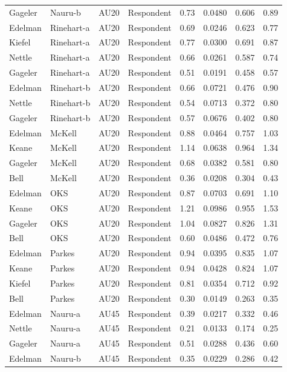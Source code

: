 \documentclass{monashthesis}
\begin{document}
\begin{center}
\begin{longtable}{llllllll}
Gageler & Nauru-b & AU20 & Respondent & 0.73 & 0.0480 & 0.606 & 0.89 \\
Edelman & Rinehart-a & AU20 & Respondent & 0.69 & 0.0246 & 0.623 & 0.77 \\
Kiefel & Rinehart-a & AU20 & Respondent & 0.77 & 0.0300 & 0.691 & 0.87 \\
Nettle & Rinehart-a & AU20 & Respondent & 0.66 & 0.0261 & 0.587 & 0.74 \\
Gageler & Rinehart-a & AU20 & Respondent & 0.51 & 0.0191 & 0.458 & 0.57 \\
Edelman & Rinehart-b & AU20 & Respondent & 0.66 & 0.0721 & 0.476 & 0.90 \\
Nettle & Rinehart-b & AU20 & Respondent & 0.54 & 0.0713 & 0.372 & 0.80 \\
Gageler & Rinehart-b & AU20 & Respondent & 0.57 & 0.0676 & 0.402 & 0.80 \\
Edelman & McKell & AU20 & Respondent & 0.88 & 0.0464 & 0.757 & 1.03 \\
Keane & McKell & AU20 & Respondent & 1.14 & 0.0638 & 0.964 & 1.34 \\
Gageler & McKell & AU20 & Respondent & 0.68 & 0.0382 & 0.581 & 0.80 \\
Bell & McKell & AU20 & Respondent & 0.36 & 0.0208 & 0.304 & 0.43 \\
Edelman & OKS & AU20 & Respondent & 0.87 & 0.0703 & 0.691 & 1.10 \\
Keane & OKS & AU20 & Respondent & 1.21 & 0.0986 & 0.955 & 1.53 \\
Gageler & OKS & AU20 & Respondent & 1.04 & 0.0827 & 0.826 & 1.31 \\
Bell & OKS & AU20 & Respondent & 0.60 & 0.0486 & 0.472 & 0.76 \\
Edelman & Parkes & AU20 & Respondent & 0.94 & 0.0395 & 0.835 & 1.07 \\
Keane & Parkes & AU20 & Respondent & 0.94 & 0.0428 & 0.824 & 1.07 \\
Kiefel & Parkes & AU20 & Respondent & 0.81 & 0.0354 & 0.712 & 0.92 \\
Bell & Parkes & AU20 & Respondent & 0.30 & 0.0149 & 0.263 & 0.35 \\
Edelman & Nauru-a & AU45 & Respondent & 0.39 & 0.0217 & 0.332 & 0.46 \\
Nettle & Nauru-a & AU45 & Respondent & 0.21 & 0.0133 & 0.174 & 0.25 \\
Gageler & Nauru-a & AU45 & Respondent & 0.51 & 0.0288 & 0.436 & 0.60 \\
Edelman & Nauru-b & AU45 & Respondent & 0.35 & 0.0229 & 0.286 & 0.42 \\

\end{longtable}
\end{center}
\end{document}
